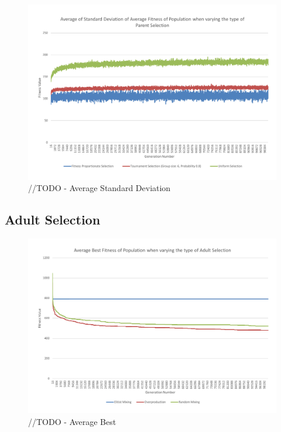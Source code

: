\begin{figure}
	\centerline{\includegraphics[width=\paperwidth]{figures/CircleTests/CircleTestParentSelectionAverageStandardDeviation.pdf}}
	\caption{//TODO - Average Standard Deviation}
\end{figure}

\subsection{Adult Selection} %
\label{sub:adult_selection}
\begin{figure}
	\centerline{\includegraphics[width=\paperwidth]{figures/CircleTests/CircleTestAdultSelectionAverageBest.pdf}}
	\caption{//TODO - Average Best}
\end{figure}

